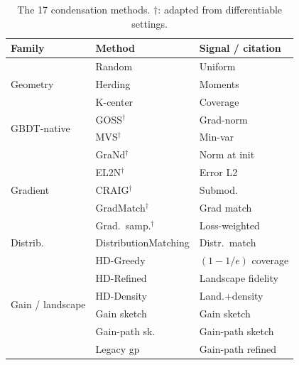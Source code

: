 \documentclass[conference]{IEEEtran}
\begin{document}



\begin{table}[t]
\centering
\caption{The 17 condensation methods. $\dagger$: adapted from differentiable settings.}
\label{tab:methods}
\tiny
\setlength{\tabcolsep}{2pt}
\begin{tabular}{@{}llp{20mm}@{}}
\toprule
\textbf{Family} & \textbf{Method} & \textbf{Signal / citation} \\
\midrule
\multirow{3}{*}{Geometry}
  & Random         & Uniform \\
  & Herding        & Moments~\cite{welling2009herding} \\
  & K-center       & Coverage~\cite{sener2018kcenter} \\
\midrule
\multirow{2}{*}{GBDT-native}
  & GOSS$^\dagger$  & Grad-norm~\cite{ke2017lightgbm} \\
  & MVS$^\dagger$   & Min-var~\cite{ibragimov2019mvs} \\
\midrule
\multirow{5}{*}{Gradient}
  & GraNd$^\dagger$       & Norm at init~\cite{paul2021el2n} \\
  & EL2N$^\dagger$        & Error L2~\cite{paul2021el2n} \\
  & CRAIG$^\dagger$        & Submod.~\cite{mirzasoleiman2020craig} \\
  & GradMatch$^\dagger$   & Grad match~\cite{killamsetty2021gradmatch} \\
  & Grad.\ samp.$^\dagger$ & Loss-weighted \\
\midrule
Distrib.
  & DistributionMatching & Distr.\ match~\cite{zhao2023dm} \\
\midrule
\multirow{6}{*}{Gain / landscape}
  & HD-Greedy  & $(1-1/e)$ coverage \\
  & HD-Refined & Landscape fidelity \\
  & HD-Density & Land.+density \\
  & Gain sketch & Gain sketch \\
  & Gain-path sk. & Gain-path sketch \\
  & Legacy gp & Gain-path refined \\
\bottomrule
\end{tabular}
\end{table}

\end{document}
